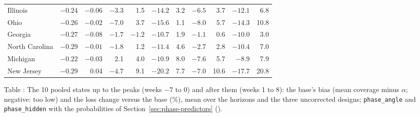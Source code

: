 \documentclass[11pt,a4paper]{article}
\theoremstyle{definition}
\theoremstyle{remark}
\begin{document}
\begin{center}
\begin{tabular}{@{}lrrrrrrrrrr@{}}
Illinois & $-0.24$ & $-0.06$ & $-3.3$ & 1.5 & $-14.2$ & 3.2 & $-6.5$ & 3.7 & $-12.1$ & 6.8 \\
Ohio & $-0.26$ & $-0.02$ & $-7.0$ & 3.7 & $-15.6$ & 1.1 & $-8.0$ & 5.7 & $-14.3$ & 10.8 \\
Georgia & $-0.27$ & $-0.08$ & $-1.7$ & $-1.2$ & $-10.7$ & 1.9 & $-1.1$ & 0.6 & $-10.0$ & 3.0 \\
North Carolina & $-0.29$ & $-0.01$ & $-1.8$ & 1.2 & $-11.4$ & 4.6 & $-2.7$ & 2.8 & $-10.4$ & 7.0 \\
Michigan & $-0.22$ & $-0.03$ & 2.1 & 4.0 & $-10.9$ & 8.0 & $-7.6$ & 5.7 & $-8.9$ & 7.9 \\
New Jersey & $-0.29$ & 0.04 & $-4.7$ & 9.1 & $-20.2$ & 7.7 & $-7.0$ & 10.6 & $-17.7$ & 20.8 \\
\bottomrule
\end{tabular}
\end{center}
\label{tab:locations-phase}
\begin{center}\small Table \thetable: The 10 pooled states up to the peaks
(weeks $-7$ to 0) and after them (weeks 1 to 8): the base's bias (mean
coverage minus $\alpha$; negative: too low) and the loss change versus the
base (\%), mean over the horizons and the three uncorrected designs; \texttt{phase\_angle}
and \texttt{phase\_hidden} with the probabilities of
Section~\ref{sec:phase-predictors} ().
\end{center}
\end{document}
